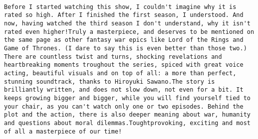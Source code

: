 \documentclass[
]{article}
\begin{document}
\begin{verbatim}
                                                                                                                                                                                                                                                                                                                                                                                                                                                                                                                                                                                                                                                                                                                                                                                                                                                                                                                                                                                                                                                                                                                                                                                                                                                                                                                                                                                                                                                                                                                                                                                                                                                                                                                                                                                                                                                                                                                                                                                                                                                                                                                                                                        Before I started watching this show, I couldn't imagine why it is rated so high. After I finished the first season, I understood. And now, having watched the third season I don't understand, why it isn't rated even higher!Truly a masterpiece, and deserves to be mentioned on the same page as other fantasy war epics like Lord of the Rings and Game of Thrones. (I dare to say this is even better than those two.) There are countless twist and turns, shocking revelations and heartbreaking moments troughout the series, spiced with great voice acting, beautiful visuals and on top of all: a more than perfect, stunning soundtrack, thanks to Hiroyuki Sawano.The story is brilliantly written, and does not slow down, not even for a bit. It keeps growing bigger and bigger, while you will find yourself tied to your chair, as you can't watch only one or two episodes. Behind the plot and the action, there is also deeper meaning about war, humanity and questions about moral dilemmas.Toughtprovoking, exciting and most of all a masterpiece of our time!

\end{verbatim}
\end{document}
